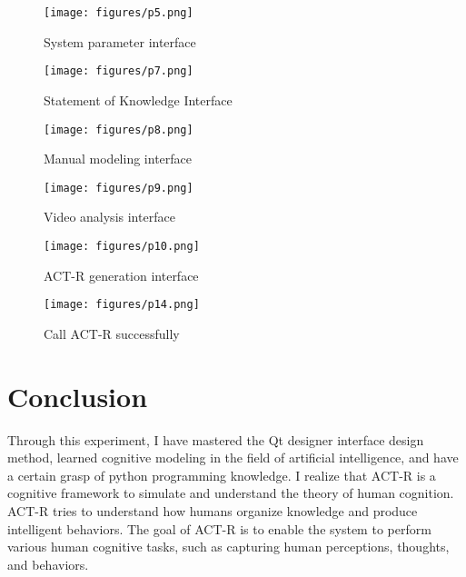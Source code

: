 \documentclass[twoside,11pt]{article}
\begin{document}
\begin{figure}[H]
    \begin{center}
    	\texttt{[image: figures/p5.png]}
		\caption{System parameter interface}
		\label{fig:deri}
    \end{center}
\end{figure}


\begin{figure}[H]
    \begin{center}
    	\texttt{[image: figures/p7.png]}
		\caption{Statement of Knowledge Interface}
		\label{fig:deri}
    \end{center}
\end{figure}


\begin{figure}[H]
    \begin{center}
    	\texttt{[image: figures/p8.png]}
		\caption{Manual modeling interface}
		\label{fig:deri}
    \end{center}
\end{figure}

\begin{figure}[H]
    \begin{center}
    	\texttt{[image: figures/p9.png]}
		\caption{Video analysis interface}
		\label{fig:deri}
    \end{center}
\end{figure}


\begin{figure}[H]
    \begin{center}
    	\texttt{[image: figures/p10.png]}
		\caption{ACT-R generation interface}
		\label{fig:deri}
    \end{center}
\end{figure}


\begin{figure}[H]
    \begin{center}
    	\texttt{[image: figures/p14.png]}
		\caption{Call ACT-R successfully}
		\label{fig:deri}
    \end{center}
\end{figure}

\section{Conclusion}
\label{sec:conc}

Through this experiment, I have mastered the Qt designer interface design method, learned cognitive modeling in the field of artificial intelligence, and have a certain grasp of python programming knowledge. I realize that ACT-R is a cognitive framework to simulate and understand the theory of human cognition. ACT-R tries to understand how humans organize knowledge and produce intelligent behaviors. The goal of ACT-R is to enable the system to perform various human cognitive tasks, such as capturing human perceptions, thoughts, and behaviors.
\end{document}
